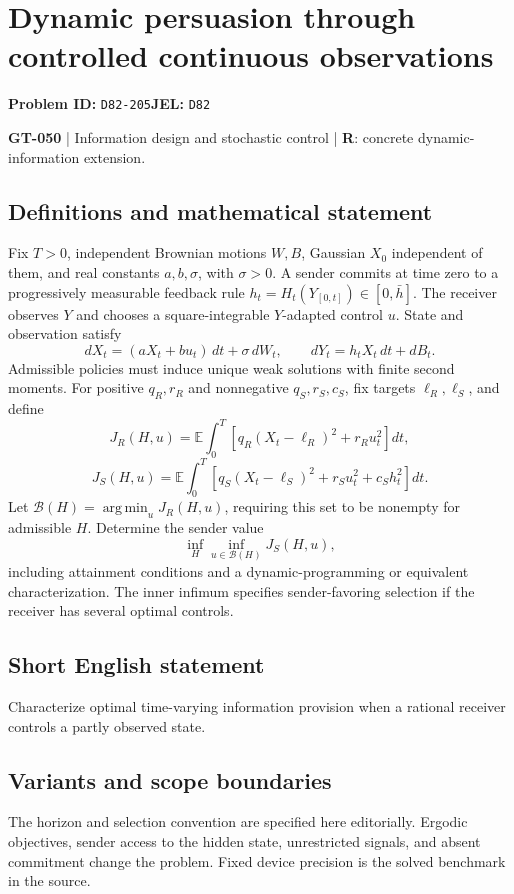 \documentclass[11pt,a4paper]{article}
\begin{document}
\section*{Dynamic persuasion through controlled continuous observations}
\textbf{Problem ID:} \texttt{D82-205}\quad \textbf{JEL:} \texttt{D82}\par
\label{problem:OP-0180}
\label{game:GT-050}
{\sffamily\small\color{muted}
\textbf{GT-050} | Information design and stochastic control | \textbf{R}: concrete dynamic-information extension.
\par}
\subsection*{Definitions and mathematical statement}
Fix $T>0$, independent Brownian motions $W,B$, Gaussian $X_0$ independent of them, and real constants $a,b,\sigma$, with $\sigma>0$. A sender commits at time zero to a progressively measurable feedback rule $h_t=H_t(Y_{[0,t]})\in[0,\bar h]$. The receiver observes $Y$ and chooses a square-integrable $Y$-adapted control $u$. State and observation satisfy
\[
 dX_t=(aX_t+bu_t)\,dt+\sigma\,dW_t,
 \qquad dY_t=h_tX_t\,dt+dB_t.
\]
Admissible policies must induce unique weak solutions with finite second moments. For positive $q_R,r_R$ and nonnegative $q_S,r_S,c_S$, fix targets $\ell_R,\ell_S$, and define
\[
 J_R(H,u)=\mathbb E\int_0^T[q_R(X_t-\ell_R)^2+r_Ru_t^2]dt,
\]
\[
 J_S(H,u)=\mathbb E\int_0^T[q_S(X_t-\ell_S)^2+r_Su_t^2+c_Sh_t^2]dt.
\]
Let $\mathcal B(H)=\operatorname*{arg\,min}_u J_R(H,u)$, requiring this set to be nonempty for admissible $H$. Determine the sender value
\[
 \inf_H\inf_{u\in\mathcal B(H)}J_S(H,u),
\]
including attainment conditions and a dynamic-programming or equivalent characterization. The inner infimum specifies sender-favoring selection if the receiver has several optimal controls.
\subsection*{Short English statement}
Characterize optimal time-varying information provision when a rational receiver controls a partly observed state.
\subsection*{Variants and scope boundaries}
The horizon and selection convention are specified here editorially. Ergodic objectives, sender access to the hidden state, unrestricted signals, and absent commitment change the problem. Fixed device precision is the solved benchmark in the source.
\end{document}
